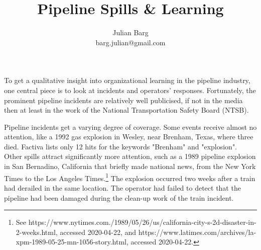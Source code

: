 \documentclass[12pt, man, natbib]{apa6}
\title{Pipeline Spills \& Learning}
\author{Julian Barg\\barg.julian@gmail.com}
\affiliation{Ivey Business School}
\begin{document}
	
	\maketitle
	
	\singlespacing
	
	\section{}
	
	To get a qualitative insight into organizational learning in the pipeline industry, one central piece is to look at incidents and operators' responses. Fortunately, the prominent pipeline incidents are relatively well publicised, if not in the media then at least in the work of the National Transportation Safety Board (NTSB). 
	
	Pipeline incidents get a varying degree of coverage. Some events receive almost no attention, like a 1992 gas explosion in Wesley, near Brenham, Texas, where three died. Factiva lists only 12 hits for the keywords "Brenham" and "explosion". Other spills attract significantly more attention, such as a 1989 pipeline explosion in San Bernadino, California that briefly made national news, from the New York Times to the Los Angeles Times.\footnote{See https://www.nytimes.com./1989/05/26/us/california-city-s-2d-disaster-in-2-weeks.html, accessed 2020-04-22, and https://www.latimes.com/archives/la-xpm-1989-05-25-mn-1056-story.html, accessed 2020-04-22.} The explosion occurred two weeks after a train had derailed in the same location. The operator had failed to detect that the pipeline had been damaged during the clean-up work of the train incident.


\end{document}
